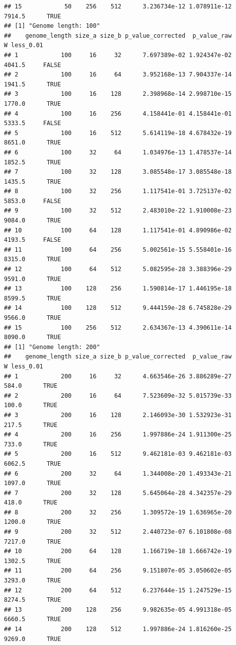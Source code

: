 \documentclass[
]{book}
\begin{document}
\begin{verbatim}
## 15            50    256    512      3.236734e-12 1.078911e-12 7914.5      TRUE
## [1] "Genome length: 100"
##    genome_length size_a size_b p_value_corrected  p_value_raw      W less_0.01
## 1            100     16     32      7.697389e-02 1.924347e-02 4041.5     FALSE
## 2            100     16     64      3.952168e-13 7.904337e-14 1941.5      TRUE
## 3            100     16    128      2.398968e-14 2.998710e-15 1770.0      TRUE
## 4            100     16    256      4.158441e-01 4.158441e-01 5333.5     FALSE
## 5            100     16    512      5.614119e-18 4.678432e-19 8651.0      TRUE
## 6            100     32     64      1.034976e-13 1.478537e-14 1852.5      TRUE
## 7            100     32    128      3.085548e-17 3.085548e-18 1435.5      TRUE
## 8            100     32    256      1.117541e-01 3.725137e-02 5853.0     FALSE
## 9            100     32    512      2.483010e-22 1.910008e-23 9084.0      TRUE
## 10           100     64    128      1.117541e-01 4.890986e-02 4193.5     FALSE
## 11           100     64    256      5.002561e-15 5.558401e-16 8315.0      TRUE
## 12           100     64    512      5.082595e-28 3.388396e-29 9591.0      TRUE
## 13           100    128    256      1.590814e-17 1.446195e-18 8599.5      TRUE
## 14           100    128    512      9.444159e-28 6.745828e-29 9566.0      TRUE
## 15           100    256    512      2.634367e-13 4.390611e-14 8090.0      TRUE
## [1] "Genome length: 200"
##    genome_length size_a size_b p_value_corrected  p_value_raw      W less_0.01
## 1            200     16     32      4.663546e-26 3.886289e-27  584.0      TRUE
## 2            200     16     64      7.523609e-32 5.015739e-33  100.0      TRUE
## 3            200     16    128      2.146093e-30 1.532923e-31  217.5      TRUE
## 4            200     16    256      1.997886e-24 1.911300e-25  733.0      TRUE
## 5            200     16    512      9.462181e-03 9.462181e-03 6062.5      TRUE
## 6            200     32     64      1.344008e-20 1.493343e-21 1097.0      TRUE
## 7            200     32    128      5.645064e-28 4.342357e-29  418.0      TRUE
## 8            200     32    256      1.309572e-19 1.636965e-20 1200.0      TRUE
## 9            200     32    512      2.440723e-07 6.101808e-08 7217.0      TRUE
## 10           200     64    128      1.166719e-18 1.666742e-19 1302.5      TRUE
## 11           200     64    256      9.151807e-05 3.050602e-05 3293.0      TRUE
## 12           200     64    512      6.237644e-15 1.247529e-15 8274.5      TRUE
## 13           200    128    256      9.982635e-05 4.991318e-05 6660.5      TRUE
## 14           200    128    512      1.997886e-24 1.816260e-25 9269.0      TRUE

\end{verbatim}
\end{document}
